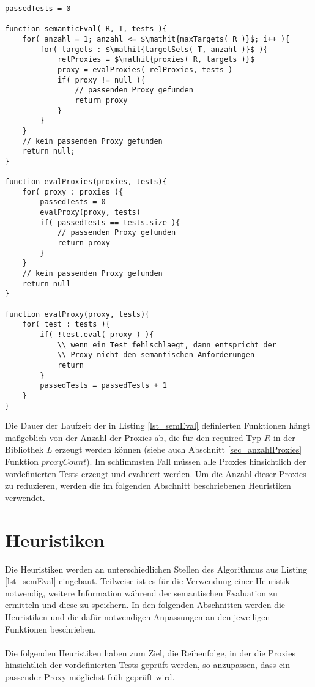 \begin{lstlisting}[style = pseudo, caption = Semantische Evaluation ohne Heuristiken, captionpos = b, label = lst_semEval]
passedTests = 0

function semanticEval( R, T, tests ){
	for( anzahl = 1; anzahl <= $\mathit{maxTargets( R )}$; i++ ){
		for( targets : $\mathit{targetSets( T, anzahl )}$ ){
			relProxies = $\mathit{proxies( R, targets )}$
			proxy = evalProxies( relProxies, tests )	
			if( proxy != null ){
				// passenden Proxy gefunden
				return proxy
			}
		}
	}
	// kein passenden Proxy gefunden
	return null;
}

function evalProxies(proxies, tests){
	for( proxy : proxies ){
		passedTests = 0
		evalProxy(proxy, tests)
		if( passedTests == tests.size ){
			// passenden Proxy gefunden
			return proxy
		}
	}
	// kein passenden Proxy gefunden
	return null
}

function evalProxy(proxy, tests){
	for( test : tests ){
		if( !test.eval( proxy ) ){
			\\ wenn ein Test fehlschlaegt, dann entspricht der 
			\\ Proxy nicht den semantischen Anforderungen
			return
		}
		passedTests = passedTests + 1
	}
}
\end{lstlisting}
Die Dauer der Laufzeit der in Listing \ref{lst_semEval} definierten Funktionen hängt maßgeblich von der Anzahl der Proxies ab, die für den required Typ $R$ in der Bibliothek $L$ erzeugt werden können (siehe auch Abschnitt \ref{sec_anzahlProxies} Funktion $\mathit{proxyCount}$). Im schlimmsten Fall müssen alle Proxies hinsichtlich der vordefinierten Tests erzeugt und evaluiert werden. Um die Anzahl dieser Proxies zu reduzieren, werden die im folgenden Abschnitt beschriebenen Heuristiken verwendet.


\section{Heuristiken}\label{sec_heuristics}
Die Heuristiken werden an unterschiedlichen Stellen des Algorithmus aus Listing \ref{lst_semEval} eingebaut. Teilweise ist es für die Verwendung einer Heuristik notwendig, weitere Information während der semantischen Evaluation zu ermitteln und diese zu speichern. In den folgenden Abschnitten werden die Heuristiken und die dafür notwendigen Anpassungen an den jeweiligen Funktionen beschrieben.
\\\\
Die folgenden Heuristiken haben zum Ziel, die Reihenfolge, in der die Proxies hinsichtlich der vordefinierten Tests geprüft werden, so anzupassen, dass ein passender Proxy möglichst früh geprüft wird.


